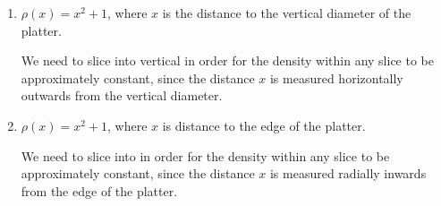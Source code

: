 \documentclass{article}
\begin{document}
\begin{enumerate}
\begin{enumerate}
  \item
    \begin{problem}[\vfill]
      $\rho(x) = x^2 + 1$, where $x$ is the distance to the vertical diameter of the platter.
    \end{problem}

    \begin{solution}
      We need to slice into vertical  in order
      for the density within any slice to be approximately constant, since the distance $x$ is measured horizontally outwards from the vertical diameter.

    \end{solution}

  \item
    \begin{problem}[\vfill]
      $\rho(x) = x^2 + 1$, where $x$ is distance to the edge of the
      platter. 
    \end{problem}

    \begin{solution}
      We need to slice into  in order for the
      density within any slice to be approximately constant, since the distance $x$ is measured radially inwards from the edge of the platter.
      
    \end{solution}

  \end{enumerate}

\pspace{\newpage}


\end{enumerate}
\end{document}
